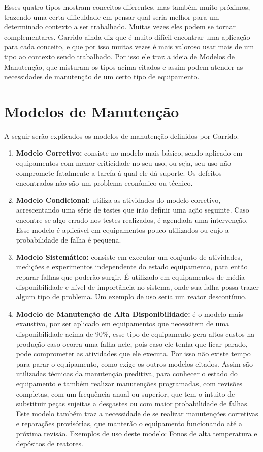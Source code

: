 Esses quatro tipos mostram conceitos diferentes, mas também muito próximos, trazendo uma certa dificuldade em pensar qual seria melhor para um determinado contexto a ser trabalhado. Muitas vezes eles podem se tornar complementares. Garrido \cite{garrido} ainda diz que é muito difícil encontrar uma aplicação para cada conceito, e que por isso muitas vezes é mais valoroso usar mais de um tipo ao contexto sendo trabalhado. Por isso ele traz a ideia de Modelos de Manutenção, que misturam os tipos acima citados e assim podem atender as necessidades de manutenção de um certo tipo de equipamento.

\section{Modelos de Manutenção}
\label{sec_modelos_manutencao}

A seguir serão explicados os modelos de manutenção definidos por Garrido.

\begin{enumerate}
	\item \textbf{Modelo Corretivo:} consiste no modelo mais básico, sendo aplicado em equipamentos com menor criticidade no seu uso, ou seja, seu uso não compromete fatalmente a tarefa à qual ele dá suporte. Os defeitos encontrados não são um problema econômico ou técnico. 
	\item \textbf{Modelo Condicional:} utiliza as atividades do modelo corretivo, acrescentando uma série de testes que irão definir uma ação seguinte. Caso encontre-se algo errado nos testes realizados, é agendada uma intervenção. Esse modelo é aplicável em equipamentos pouco utilizados ou cujo a probabilidade de falha é pequena.
	\item \textbf{Modelo Sistemático:} consiste em executar um conjunto de atividades, medições e experimentos independente do estado equipamento, para então reparar falhas que poderão surgir. É utilizado em equipamentos de média disponibilidade e nível de importância no sistema, onde sua falha possa trazer algum tipo de problema. Um exemplo de uso seria um reator descontínuo. 
	\item \textbf{Modelo de Manutenção de Alta Disponibilidade:} é o modelo mais exaustivo, por ser aplicado em equipamentos que necessitem de uma disponibilidade acima de 90\%, esse tipo de equipamento gera altos custos na produção caso ocorra uma falha nele, pois caso ele tenha que ficar parado, pode comprometer as atividades que ele executa. Por isso não existe tempo para parar o equipamento, como exige os outros modelos citados. Assim são utilizadas técnicas da manutenção preditiva, para conhecer o estado do equipamento e também realizar manutenções programadas, com revisões completas, com um frequência anual ou superior, que tem o intuito de substituir peças sujeitas a desgastes ou com maior probabilidade de falhas. 
	\\
	Este modelo também traz a necessidade de se realizar manutenções corretivas e reparações provisórias, que manterão o equipamento funcionando até a próxima revisão. Exemplos de uso deste modelo: Fonos de alta temperatura e depósitos de reatores.
\end{enumerate} 

